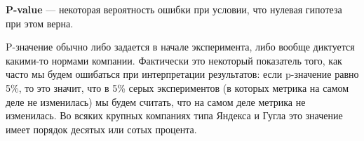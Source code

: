 \textbf{P-value} --- некоторая вероятность ошибки при условии, что нулевая гипотеза при этом верна.

P-значение обычно либо задается в начале эксперимента, либо вообще диктуется какими-то нормами компании. Фактически это некоторый показатель того, как часто мы будем ошибаться при интерпретации результатов: если p-значение равно 5\%, то это значит, что в 5\% серых экспериментов (в которых метрика на самом деле не изменилась) мы будем считать, что на самом деле метрика не изменилась. Во всяких крупных компаниях типа Яндекса и Гугла это значение имеет порядок десятых или сотых процента. 